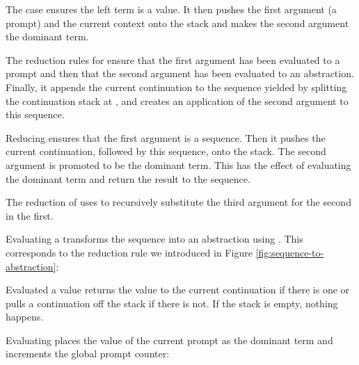 The  case ensures the left term is a value.
It then pushes the first argument (a prompt) and the current context onto the stack and makes the second argument the dominant term. 

The reduction rules for  ensure that the first argument has been evaluated to a prompt  and then that the second argument has been evaluated to an abstraction. 
Finally, it appends the current continuation to the sequence yielded by splitting the continuation stack at , 
and creates an application of the second argument to this sequence.

Reducing  ensures that the first argument is a sequence.
Then it pushes the current continuation, followed by this sequence, onto the stack.
The second argument is promoted to be the dominant term.
This has the effect of evaluating the dominant term and return the result to the sequence.

The reduction of  uses  to recursively substitute the third argument for the second in the first. 

Evaluating a  transforms the sequence into an abstraction using . This corresponds to the reduction rule we introduced in Figure \ref{fig:sequence-to-abstraction}:

Evaluated a value returns the value to the current continuation if there is one or pulls a continuation off the stack if there is not. If the stack is empty, nothing happens.

Evaluating  places the value of the current prompt as the dominant term and increments the global prompt counter:



